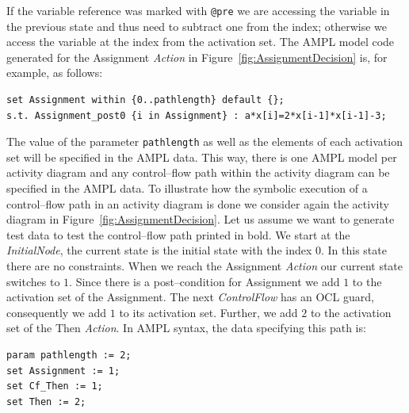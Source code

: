 \documentclass[runningheads,a4paper]{llncs}%
\newcommand{\UMLType}[1]{\textsf{\textit{#1}}} %
\newcommand{\AMPLCode}[1]{\texttt{#1}}
\begin{document}
If the variable reference was marked with \verb=@pre= we are accessing the
variable in the previous state and thus need to subtract one from the index;
otherwise we access the variable at the index from the activation set. The AMPL
model code generated for the Assignment \UMLType{Action} in
Figure~\ref{fig:AssignmentDecision} is, for example, as follows:%
\begin{lstlisting}[basicstyle=\ttfamily,language=ampl,breaklines=true]
set Assignment within {0..pathlength} default {};
s.t. Assignment_post0 {i in Assignment} : a*x[i]=2*x[i-1]*x[i-1]-3;
\end{lstlisting}
The value of the parameter \AMPLCode{pathlength} as well as the elements of each
activation set will be specified in the AMPL data. This way, there is one AMPL
model per activity diagram and any control--flow path within the activity
diagram can be specified in the AMPL data. To illustrate how the symbolic
execution of a control--flow path in an activity diagram is done we consider
again the activity diagram in Figure~\ref{fig:AssignmentDecision}. Let us assume
we want to generate test data to test the control--flow path printed in bold. We
start at the \UMLType{InitialNode}, the current state is the initial state with
the index $0$. In this state there are no constraints. When we reach the
Assignment \UMLType{Action} our current state switches to $1$. Since there is a
post--condition for Assignment we add $1$ to the activation set of the
Assignment. The next \UMLType{ControlFlow} has an OCL guard, consequently we add
$1$ to its activation set. Further, we add $2$ to the activation set of the Then
\UMLType{Action}. In AMPL syntax, the data specifying this path is:%
\begin{lstlisting}[basicstyle=\ttfamily,language=ampl]
param pathlength := 2;
set Assignment := 1;
set Cf_Then := 1;
set Then := 2;
\end{lstlisting}%
\end{document}
